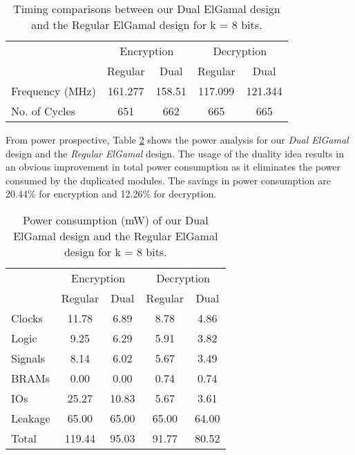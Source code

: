 \documentclass[conference]{IEEEtran}
\begin{document}
\begin{table}[t]
  \centering
  \caption{Timing comparisons between our Dual ElGamal design and the Regular ElGamal design for k = 8 bits.}
    \tabcolsep=0.11cm 
\begin{tabular}{|l||c|c||c|c|}
    \toprule
                    & \multicolumn{2}{c}{Encryption }  & \multicolumn{2}{c}{Decryption} \vline \\
                    & Regular & Dual    & Regular & Dual \\
\midrule
    Frequency (MHz) & 161.277 & 158.51  & 117.099 & 121.344 \\
    No. of Cycles   & 651     & 662     & 665     & 665 \\
\bottomrule
    \end{tabular}\label{tab:FullTiming}\end{table}
From power prospective, Table \ref{tab:FullPower} shows the power analysis for our \textit{Dual ElGamal} design and the \textit{Regular ElGamal} design. The usage of the duality idea results in an obvious improvement in total power consumption as it eliminates the power consumed by the duplicated modules. The savings in power consumption are 20.44\% for encryption and 12.26\% for decryption. 

\begin{table}[t]
  \centering
  \caption{Power consumption (mW) of our Dual ElGamal design and the Regular ElGamal design for k = 8 bits.}
    \tabcolsep=0.11cm 
\begin{tabular}{|l||c|c||c|c|}
    \toprule
                    & \multicolumn{2}{c}{Encryption }  & \multicolumn{2}{c}{Decryption} \vline \\
                    & Regular & Dual    & Regular & Dual \\
\midrule
	 Clocks  & 11.78 & 6.89 & 8.78 & 4.86 \\
    Logic   & 9.25 & 6.29 & 5.91 & 3.82 \\
    Signals & 8.14 & 6.02 & 5.67 & 3.49 \\
    BRAMs   & 0.00 & 0.00 & 0.74 & 0.74 \\
    IOs     & 25.27 & 10.83 & 5.67 & 3.61 \\
    Leakage & 65.00 & 65.00 & 65.00 & 64.00 \\
    \midrule
    Total   & 119.44 & 95.03 & 91.77 & 80.52 \\
    \bottomrule 
    \end{tabular}\label{tab:FullPower}\end{table}
\end{document}
